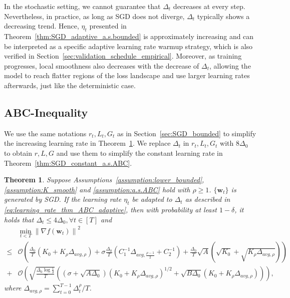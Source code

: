 \documentclass{article}
\newtheorem{theorem}{Theorem}
\newcommand{\Norm}[1]{\left\|#1\right\|}
\newcommand{\Kr}{K_{\rho}}
\newcommand{\paren}[1]{\left( #1 \right)}
\newcommand{\bw}{\mathbf{w}}
\begin{document}
In the stochastic setting, we cannot guarantee that $\Delta_t$ decreases at every step. Nevertheless, in practice, as long as SGD does not diverge, $\Delta_t$ typically shows a decreasing trend. Hence, $\eta_t$ presented in Theorem~\ref{thm:SGD_adaptive_a.s.bounded} is approximately increasing and can be interpreted as a specific adaptive learning rate warmup strategy, which is also verified in Section~\ref{sec:validation_schedule_empirical}. Moreover, as training progresses, local smoothness also decreases with the decrease of $\Delta_t$, allowing the model to reach flatter regions of the loss landscape and use larger learning rates afterwards, just like the deterministic case.


\subsection{ABC-Inequality}\label{sec:SGD_ABC}

We use the same notations $r_t,L_t,G_t$ as in Section~\ref{sec:SGD_bounded} to simplify the increasing learning rate in Theorem~\ref{thm:SGD_adaptive_a.s.ABC}. We replace $\Delta_t$ in $r_t,L_t,G_t$ with $8\Delta_0$ to obtain $r,L,G$ and use them to simplify the constant learning rate in Theorem~\ref{thm:SGD_constant_a.s.ABC}.


\begin{theorem}\label{thm:SGD_adaptive_a.s.ABC}
    Suppose Assumptions~\ref{assumption:lower_bounded}, \ref{assumption:K_smooth} and \ref{assumption:a.s.ABC} hold with $\rho\geq 1$. $\{\bw_t\}$ is generated by SGD. 
    If the learning rate $\eta_t$ be adapted to $\Delta_t$ as described in \eqref{eq:learning_rate_thm_ABC_adaptive},
    then with probability at least $1-\delta$, it holds that 
    $\Delta_t\leq 4\Delta_0,\forall t\in[T]$ and
    \begin{align*}
        &\min_{t<T} \Norm{\nabla f(\bw_t)}^2\\
        \leq&
        \mathcal{O}\paren{\frac{\Delta_0}{T}\paren{K_0+\Kr\Delta_{avg,\rho}}+\sigma\frac{\Delta_0}{T}\paren{C_1^{-1}\Delta_{avg,\frac{\rho-1}{2}}+C_2^{-1}}
        +\frac{\Delta_0}{T}\sqrt{A}\paren{\sqrt{K_0}+\sqrt{\Kr\Delta_{avg,\rho}}}}\\
        +&\mathcal{O}\paren{\sqrt{\frac{\Delta_0\log\frac{1}{\delta}}{T}}\paren{ \paren{\sigma+\sqrt{A\Delta_0}}\paren{K_0+\Kr\Delta_{avg,\rho}}^{1/2}+\sqrt{B\Delta_0}\paren{K_0+\Kr\Delta_{avg,\rho}}}},
    \end{align*}
    where $\Delta_{avg,\rho}=\sum_{t=0}^{T-1}\Delta_t^\rho/T$.
\end{theorem}
\end{document}
